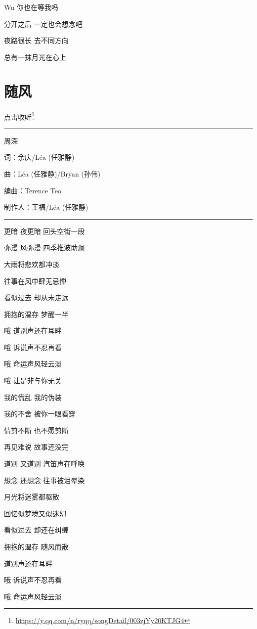 \documentclass[]{ctexbook}
\renewcommand{\href}[2]{#2\footnote{\url{#1}}}
\begin{document}
Wu 你也在等我吗

分开之后 一定也会想念吧

夜路很长 去不同方向

总有一抹月光在心上

\section*{随风}\label{with-wind}


\href{https://y.qq.com/n/ryqq/songDetail/003zjYy20KTJG4}{点击收听}

\begin{center}\rule{0.5\linewidth}{0.5pt}\end{center}

周深

词：余庆/Léa (任雅静)

曲：Léa (任雅静)/Bryan (孙伟)

编曲：Terence Teo

制作人：王福/Léa (任雅静)

\begin{center}\rule{0.5\linewidth}{0.5pt}\end{center}

更暗 夜更暗 回头空街一段

弥漫 风弥漫 四季推波助澜

大雨将悲欢都冲淡

往事在风中肆无忌惮

看似过去 却从未走远

拥抱的温存 梦醒一半

哦 道别声还在耳畔

哦 诉说声不忍再看

哦 命运声风轻云淡

哦 让是非与你无关

我的慌乱 我的伪装

我的不舍 被你一眼看穿

情剪不断 也不愿剪断

再见难说 故事还没完

道别 又道别 汽笛声在呼唤

想念 还想念 往事被泪晕染

月光将迷雾都驱散

回忆似梦境又似迷幻

看似过去 却还在纠缠

拥抱的温存 随风而散

道别声还在耳畔

哦 诉说声不忍再看

哦 命运声风轻云淡
\end{document}
